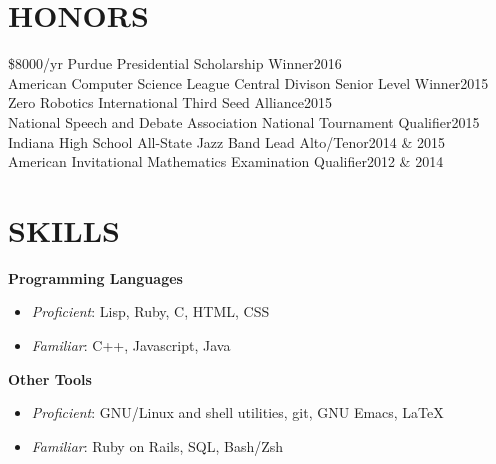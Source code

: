 \documentclass[line,margin]{res}
\begin{document}
\begin{resume}
  \section{HONORS}
  \$8000/yr Purdue Presidential Scholarship Winner\hfill 2016\\
  American Computer Science League Central Divison Senior Level Winner\hfill 2015\\
  Zero Robotics International Third Seed Alliance\hfill 2015\\
  National Speech and Debate Association National Tournament Qualifier\hfill 2015\\
  Indiana High School All-State Jazz Band Lead Alto/Tenor\hfill 2014 \& 2015\\
  American Invitational Mathematics Examination Qualifier\hfill 2012 \& 2014


  \section{SKILLS}
  {\bf\rmfamily Programming Languages}
  \begin{itemize} \itemsep -2pt
  \item \emph{Proficient}: Lisp, Ruby, C, HTML, CSS
  \item \emph{Familiar}: C++, Javascript, Java
  \end{itemize}

  {\bf\rmfamily Other Tools}
  \begin{itemize} \itemsep -2pt
  \item \emph{Proficient}: GNU/Linux and shell utilities, git, GNU Emacs, \LaTeX
  \item \emph{Familiar}: Ruby on Rails, SQL, Bash/Zsh
  \end{itemize}






\end{resume}
\end{document}
